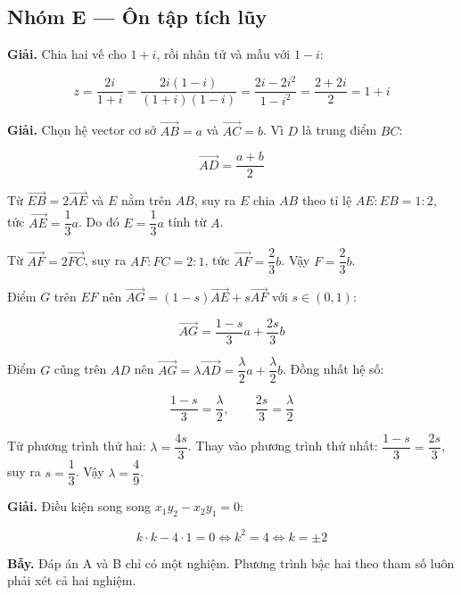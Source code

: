 \documentclass[11pt, a4paper]{article}
\begin{document}
\subsection*{Nhóm E — Ôn tập tích lũy}

\begin{dapan}[1 — Đáp án B]
\textbf{Giải.} Chia hai vế cho $1 + i$, rồi nhân tử và mẫu với $1 - i$:

$$z = \frac{2i}{1+i} = \frac{2i(1-i)}{(1+i)(1-i)} = \frac{2i - 2i^2}{1 - i^2} = \frac{2 + 2i}{2} = 1 + i$$
\end{dapan}

\begin{dapan}[2 — Đáp án B]
\textbf{Giải.} Chọn hệ vector cơ sở $\overrightarrow{AB} = a$ và $\overrightarrow{AC} = b$. Vì $D$ là trung điểm $BC$:

$$\overrightarrow{AD} = \frac{a + b}{2}$$

Từ $\overrightarrow{EB} = 2\overrightarrow{AE}$ và $E$ nằm trên $AB$, suy ra $E$ chia $AB$ theo tỉ lệ $AE : EB = 1 : 2$, tức $\overrightarrow{AE} = \dfrac{1}{3}a$. Do đó $E = \dfrac{1}{3}a$ tính từ $A$.

Từ $\overrightarrow{AF} = 2\overrightarrow{FC}$, suy ra $AF : FC = 2 : 1$, tức $\overrightarrow{AF} = \dfrac{2}{3}b$. Vậy $F = \dfrac{2}{3}b$.

Điểm $G$ trên $EF$ nên $\overrightarrow{AG} = (1-s)\overrightarrow{AE} + s\overrightarrow{AF}$ với $s \in (0,1)$:

$$\overrightarrow{AG} = \frac{1-s}{3}a + \frac{2s}{3}b$$

Điểm $G$ cũng trên $AD$ nên $\overrightarrow{AG} = \lambda\overrightarrow{AD} = \dfrac{\lambda}{2}a + \dfrac{\lambda}{2}b$. Đồng nhất hệ số:

$$\frac{1-s}{3} = \frac{\lambda}{2}, \qquad \frac{2s}{3} = \frac{\lambda}{2}$$

Từ phương trình thứ hai: $\lambda = \dfrac{4s}{3}$. Thay vào phương trình thứ nhất: $\dfrac{1-s}{3} = \dfrac{2s}{3}$, suy ra $s = \dfrac{1}{3}$. Vậy $\lambda = \dfrac{4}{9}$.
\end{dapan}

\begin{dapan}[3 — Đáp án C]
\textbf{Giải.} Điều kiện song song $x_1y_2 - x_2y_1 = 0$:

$$k \cdot k - 4 \cdot 1 = 0 \iff k^2 = 4 \iff k = \pm 2$$

\textbf{Bẫy.} Đáp án A và B chỉ có một nghiệm. Phương trình bậc hai theo tham số luôn phải xét cả hai nghiệm.
\end{dapan}
\end{document}
